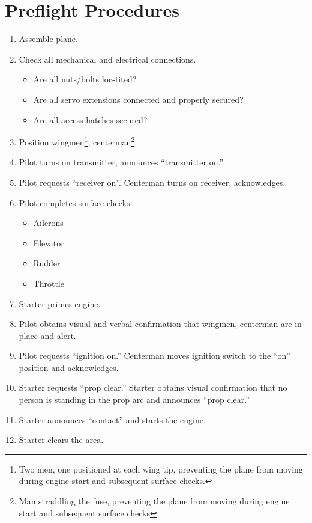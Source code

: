\documentclass[10pt]{report}
\newcommand{\itemspace}{	\setlength{\itemsep}{0cm} \setlength{\parskip}{0cm}}
\begin{document}
\newpage
\appendix
\renewcommand\thesection{Appendix \Alph{section}}
\section{Preflight Procedures}
\label{sec:appendix_preflight}
\begin{enumerate}
	\setlength{\itemsep}{0cm}
	\setlength{\parskip}{0cm}
	\item Assemble plane.
	\item Check all mechanical and electrical connections.
		\begin{itemize}
		\itemspace
		\item Are all nuts/bolts loc-tited?
		\item Are all servo extensions connected and properly secured?
		\item Are all access hatches secured?
		\end{itemize}
	\item Position wingmen\footnote{Two men, one positioned at each wing tip, preventing the plane from moving during engine start and subsequent surface checks.}, centerman\footnote{Man straddling the fuse, preventing the plane from moving during engine start and subsequent surface checks}.
	\item Pilot turns on transmitter, announces ``transmitter on.''
	\item Pilot requests ``receiver on''.  Centerman turns on receiver, acknowledges.
	\item Pilot completes surface checks:
		\begin{itemize}
		\itemspace
		\item Ailerons
		\item Elevator
		\item Rudder
		\item Throttle
		\end{itemize}
	\item Starter primes engine.
	\item Pilot obtains visual and verbal confirmation that wingmen, centerman are in place and alert.
	\item Pilot requests ``ignition on.''  Centerman moves ignition switch to the ``on'' position and acknowledges.
	\item Starter requests ``prop clear.''  Starter obtains visual confirmation that no person is standing in the prop arc and announces ``prop clear.''
	\item Starter announces ``contact'' and starts the engine.
	\item Starter clears the area.

\end{enumerate}
\end{document}

